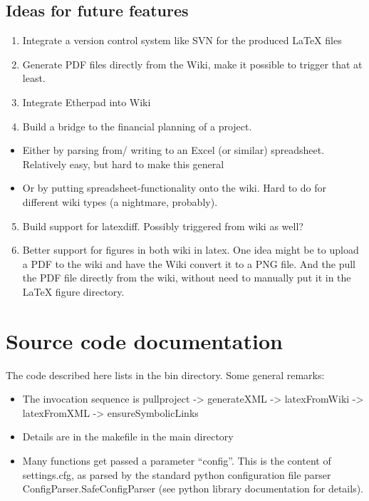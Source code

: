 \documentclass[a4paper,10pt,english]{sphinxmanual}
\begin{document}
\section{Ideas for future features}
\label{openissues:ideas-for-future-features}\begin{enumerate}
\item {} 
Integrate a version control system like SVN for
the produced LaTeX files

\item {} 
Generate PDF files directly from the Wiki, make
it possible to trigger that at least.

\item {} 
Integrate Etherpad into Wiki

\item {} 
Build a bridge to the financial planning of a
project.

\end{enumerate}
\begin{itemize}
\item {} 
Either by parsing from/ writing to an Excel
(or similar) spreadsheet. Relatively easy, but
hard to make this general

\item {} 
Or by putting spreadsheet-functionality onto
the wiki. Hard to do for different wiki types
(a nightmare, probably).

\end{itemize}
\begin{enumerate}
\setcounter{enumi}{4}
\item {} 
Build support for latexdiff. Possibly triggered
from wiki as well?

\item {} 
Better support for figures in both wiki in latex. One idea might be
to upload a PDF to the wiki and have the Wiki convert it to a PNG
file. And the pull the PDF file directly from the wiki, without
need to manually put it in the LaTeX figure directory.

\end{enumerate}


\chapter{Source code documentation}
\label{sourcecodedoc::doc}\label{sourcecodedoc:source-code-documentation}
The code described here lists in the bin directory. Some general remarks:
\begin{itemize}
\item {} 
The invocation sequence is pullproject -\textgreater{} generateXML -\textgreater{} latexFromWiki -\textgreater{} latexFromXML -\textgreater{} ensureSymbolicLinks

\item {} 
Details are in the makefile in the main directory

\item {} 
Many functions get passed a parameter ``config''. This is the content of settings.cfg, as parsed by the standard python configuration file parser ConfigParser.SafeConfigParser (see python library documentation for details).

\end{itemize}
\end{document}
